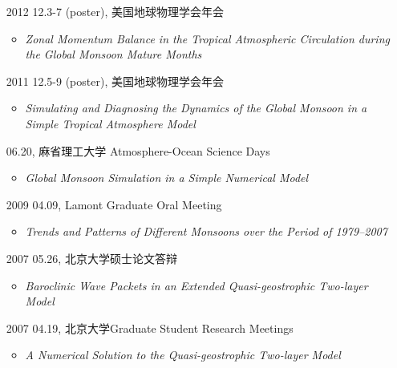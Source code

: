 \documentclass[11pt]{article}
\newcommand{\meetingName}[1]{#1}
\newcommand{\ptitle}[1]{\textit{#1}}
\begin{document}
\begin{CJK*}{UTF8}{gkai}
\begin{itemize}[leftmargin=10ex,label={},noitemsep,nolistsep]
	\item [2012] 12.3-7 (poster), \meetingName{美国地球物理学会年会}
	\begin{itemize}[leftmargin=4ex,label={},noitemsep,nolistsep]
		\item \ptitle{Zonal Momentum Balance in the Tropical Atmospheric Circulation during the Global Monsoon Mature Months}
		\end{itemize}
	
	\item [2011] 12.5-9 (poster), \meetingName{美国地球物理学会年会}
	\begin{itemize}[leftmargin=4ex,label={},noitemsep,nolistsep]
		\item \ptitle{Simulating and Diagnosing the Dynamics of the Global Monsoon in a Simple Tropical Atmosphere Model}
		\end{itemize} 
	 
	\item [\phantom{2011}] 06.20, \meetingName{麻省理工大学 Atmosphere-Ocean Science Days}
	\begin{itemize}[leftmargin=4ex,label={},noitemsep,nolistsep]
		\item \ptitle{Global Monsoon Simulation in a Simple Numerical Model}
		\end{itemize}
	
	\item [2009] 04.09, \meetingName{Lamont Graduate Oral Meeting}
	\begin{itemize}[leftmargin=4ex,label={},noitemsep,nolistsep]
		\item \ptitle{Trends and Patterns of Different Monsoons over the Period of 1979--2007}
		\end{itemize}
	
	\item [2007]05.26,  \meetingName{北京大学硕士论文答辩}
	\begin{itemize}[leftmargin=4ex,label={},noitemsep,nolistsep]
		\item \ptitle{Baroclinic Wave Packets in an Extended Quasi-geostrophic Two-layer Model}
		\end{itemize}
	
	\item [2007]04.19, \meetingName{北京大学Graduate Student Research Meetings}
	\begin{itemize}[leftmargin=4ex,label={},noitemsep,nolistsep]
		\item \ptitle{A Numerical Solution to the Quasi-geostrophic Two-layer Model}
		\end{itemize}
		

\end{itemize}
\end{CJK*}
\end{document}
